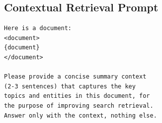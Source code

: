 \documentclass{article}
\begin{document}
\subsection{Contextual Retrieval Prompt}
\begin{small}
\begin{verbatim}
Here is a document:
<document>
{document}
</document>

Please provide a concise summary context
(2-3 sentences) that captures the key
topics and entities in this document, for
the purpose of improving search retrieval.
Answer only with the context, nothing else.
\end{verbatim}
\end{small}
\end{document}
